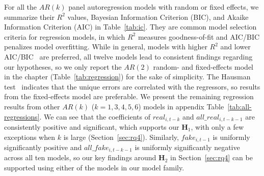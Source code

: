 For all the $AR(k)$ panel autoregression models with random or fixed effects, we summarize their $R^2$ values, Bayesian Information Criterion (BIC), and Akaike Information Criterion (AIC) in Table~\ref{tab:ic}.
They are common model selection criteria for regression models, in which $R^2$ measures goodness-of-fit and AIC/BIC penalizes model overfitting.
While in general, models with higher $R^2$ and lower AIC/BIC~\cite{kuha2004aic} are preferred, all twelve models lead to consistent findings regarding our hypotheses, so we only report the $AR(2)$ random- and fixed-effects model in the chapter (Table~\ref{tab:regression}) for the sake of simplicity.
The Hausman test~\cite{amini2012fixed} indicates that the unique errors are correlated with the regressors, so results from the fixed-effects model are preferable.
We present the remaining regression results from other $AR(k)$ ($k = 1, 3, 4, 5, 6$) models in appendix Table~\ref{tab:all-regressions}.
We can see that the coefficients of $real_{i, t-k}$ and $all\_real_{i, t-k-1}$ are consistently positive and significant, which supports our \textbf{H$_{1}$}, with only a few exceptions when $k$ is large (Section~\ref{sec:rq4}).
Similarly, $fake_{i, t-1}$ is uniformly significantly positive and $all\_fake_{i, t-k-1}$ is uniformly significantly negative across all ten models, so our key findings around \textbf{H$_{2}$} in Section~\ref{sec:rq4} can be supported using either of the models in our model family.

